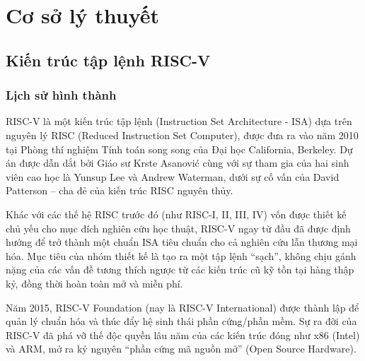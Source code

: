 \chapter{Cơ sở lý thuyết}
\label{chp:02}

\section{Kiến trúc tập lệnh RISC-V}
\label{sec:risc-v}

\subsection{Lịch sử hình thành}

RISC-V là một kiến trúc tập lệnh (Instruction Set Architecture - ISA) 
dựa trên nguyên lý RISC (Reduced Instruction Set Computer), 
được đưa ra vào năm 2010 tại Phòng thí nghiệm Tính toán song song 
của Đại học California, Berkeley. Dự án được dẫn dắt bởi 
Giáo sư Krste Asanović cùng với sự tham gia của hai sinh viên cao học 
là Yunsup Lee và Andrew Waterman, dưới sự cố vấn của David Patterson – cha đẻ 
của kiến trúc RISC nguyên thủy.

Khác với các thế hệ RISC trước đó (như RISC-I, II, III, IV) vốn được 
thiết kế chủ yếu cho mục đích nghiên cứu học thuật, RISC-V ngay từ đầu đã 
được định hướng để trở thành một chuẩn ISA tiêu chuẩn cho cả nghiên cứu lẫn 
thương mại hóa. Mục tiêu của nhóm thiết kế là tạo ra một tập lệnh ``sạch'', 
không chịu gánh nặng của các vấn đề tương thích ngược từ các kiến trúc cũ kỹ 
tồn tại hàng thập kỷ, đồng thời hoàn toàn mở và miễn phí.

Năm 2015, RISC-V Foundation (nay là RISC-V International) được thành 
lập để quản lý chuẩn hóa và thúc đẩy hệ sinh thái phần cứng/phần mềm. 
Sự ra đời của RISC-V đã phá vỡ thế độc quyền lâu năm của các kiến trúc 
đóng như x86 (Intel) và ARM, mở ra kỷ nguyên ``phần cứng mã nguồn mở'' 
(Open Source Hardware).

